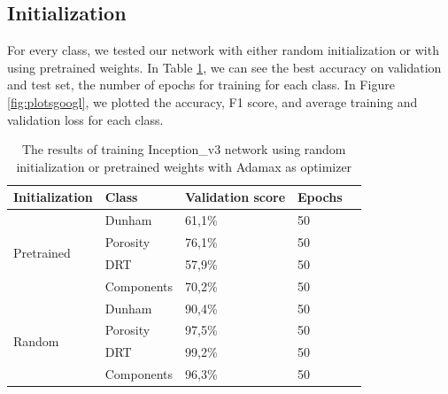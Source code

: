 \subsection{Initialization}
For every class, we tested our network with either random initialization or with using pretrained weights. In Table \ref{tab:googinit}, we can see the best accuracy on validation and test set, the number of epochs for training for each class.  
In Figure \ref{fig:plotsgoogl}, we plotted the accuracy, F1 score, and average training and validation loss for each class. 

\begin{table}
\caption[Results according to initialization of Inception\_v3]{\label{tab:googinit} The results of training Inception\_v3 network using random initialization or pretrained weights with Adamax as optimizer}
\centering
\begin{tabular}[b]{| l | l | l | l | l |}
\hline
    Initialization & Class & Validation score  & Epochs\\ \hline
    \multirow{4}{*}{Pretrained} & Dunham &  61,1\%  & 50 \\ %
    & Porosity & 76,1\% &  50 \\
    &DRT & 57,9\% &  50 \\
    &Components & 70,2\% &  50 \\ \hline
     \multirow{4}{*}{Random} & Dunham &  90,4\% & 50 \\
    & Porosity & 97,5\% &  50 \\
    &DRT & 99,2\% &  50 \\
    &Components & 96,3\% & 50 \\ \hline
\end{tabular} 
\end{table}

